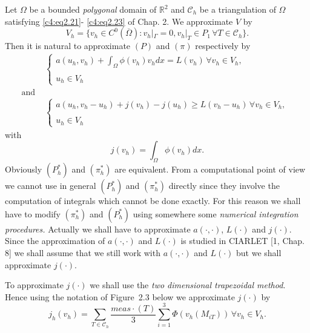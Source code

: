 Let $\Omega$ be a bounded \textit{polygonal} domain of $\mathbb{R}^2$ and $\mathscr{C}_h$ be a triangulation of $\Omega$ satisfying \eqref{c4:eq2.21}- \eqref{c4:eq2.23} of Chap. 2. We approximate $V$ by 
$$
V_h = \{v_h \in C^0 (\overline{\Omega}) : v_h |_\Gamma = 0, v_h |_T \in P_1\, \forall T \in \mathscr{C}_h\}.
$$
Then it is natural to approximate $(P)$ and $(\pi)$ respectively by 
\begin{align*}
& \begin{cases}
a (u_h, v_h) + \int_\Omega \phi (v_h) v_h dx = L(v_h)\, \forall v_h \in V_h,\\
&\\
u_h \in V_h
\end{cases} \tag{$P^*_h$}\\
\text{ and }\\
& \begin{cases}
a(u_h, v_h - u_h) +  j(v_h) - j(u_h) \geq L(v_h - u_h)\, \forall v_h \in V_h,\\
&\\
u_h \in V_h
\end{cases} \tag{$\pi^*_h$}
\end{align*}
with
$$
j(v_h) = \int_\Omega \phi (v_h) dx.
$$
Obviously $(P^*_h)$ and $(\pi^*_h)$ are equivalent. From a
computational point of view we cannot use in general $(P^*_h)$ and
$(\pi^*_h)$ directly since they involve the computation of integrals
which cannot be done exactly. For this reason we shall have to modify
$(\pi^*_h)$ and $(P^*_h)$ using somewhere some \textit{numerical
  integration procedures.} Actually we shall have to approximate
$a(\cdot, \cdot)$, $L(\cdot)$ and $j(\cdot)$. Since the approximation
of $a(\cdot, \cdot)$ and $L(\cdot)$ is studied in CIARLET [1, Chap. 8]
we shall assume that we still work with $a(\cdot, \cdot)$ and
$L(\cdot)$ but we shall approximate $j(\cdot)$. 

To approximate $j(\cdot)$ we shall use the \textit{two dimensional 
trapezoidal method}. Hence using the notation of Figure~2.3 below we approximate $j(\cdot)$ by 
\begin{equation}
j_h(v_h) = \sum_{T \in \mathscr{C}_h} \frac{meas \cdot (T)}{3} \sum^3_{i=1} \Phi (v_h(M_{iT}))\, \forall v_h \in V_h. \tag{2.78}\label{c4:eq2.78}
\end{equation}

\begin{figure}[H]
\caption{}
\end{figure}

